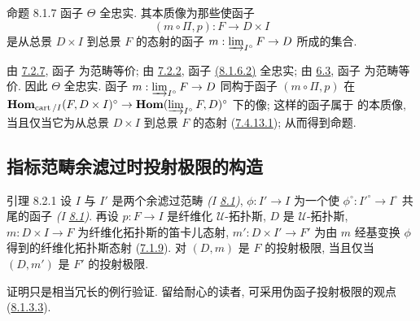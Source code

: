 \begin{enonce*}{命题 8.1.7}
函子 $\Theta$ 全忠实.
其本质像为那些使函子
$$
(m \circ \Pi, p) : F \to D \times I
$$
是从总景 $D \times I$ 到总景 $F$ 的态射的函子
$m : \varinjlim_{I^{\circ}}F \to D$ 所成的集合.
\end{enonce*}

由 \hyperref[VI.prop7.2.7]{7.2.7},
函子  为范畴等价;
由 \hyperref[VI.subsubsec7.2.2]{7.2.2},
函子 \hyperref[VI.eq8.1.6.2]{(8.1.6.2)} 全忠实;
由 \hyperref[VI.def6.3]{6.3},
函子  为范畴等价.
因此 $\Theta$ 全忠实.
函子 $m : \varinjlim_{I^{\circ}}F \to D$
同构于函子 $(m \circ \Pi, p)$ 在
$\Hhom_{\cart / I} (F, D \times I)^{\circ} \to
\Hhom(\varinjlim_{I^{\circ}}F, D)^{\circ}$ 下的像;
这样的函子属于  的本质像,
当且仅当它为从总景 $D \times I$ 到总景 $F$ 的态射
(\hyperref[VI.thm7.4.13.1]{7.4.13.1});
从而得到命题.



\subsection{指标范畴余滤过时投射极限的构造}

\begin{enonce*}{引理 8.2.1}
设 $I$ 与 $I'$ 是两个余滤过范畴
\emph{(I \hyperref[I.sec8.1]{8.1})},
$\phi:I'\to I$ 为一个使
$\phi^{\circ}:{I'}^{\circ}\to I^{\circ}$ 共尾的函子
\emph{(I \hyperref[I.sec8.1]{8.1})}.
再设 $p:F\to I$ 是纤维化 $𝒰$-拓扑斯,
$D$ 是 $𝒰$-拓扑斯,
$m:D\times I\to F$ 为纤维化拓扑斯的笛卡儿态射,
$m':D\times I'\to F'$ 为由 $m$ 经基变换 $\phi$ 得到的纤维化拓扑斯态射
(\hyperref[VI.subsubsec7.1.9]{7.1.9}).
对 $(D,m)$ 是 $F$ 的投射极限,
当且仅当 $(D,m')$ 是 $F'$ 的投射极限.
\end{enonce*}

证明\pageoriginale{}只是相当冗长的例行验证.
留给耐心的读者,
可采用伪函子投射极限的观点
(\hyperref[VI.par8.1.3.3]{8.1.3.3}).

